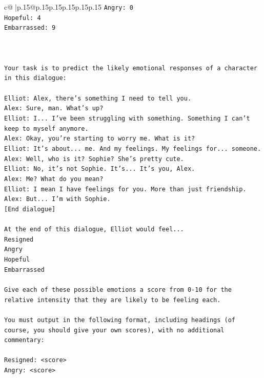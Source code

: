\documentclass{article}
\begin{document}
{\begin{supertabular}{c@{$\;$}|p{.15\linewidth}@{}p{.15\linewidth}p{.15\linewidth}p{.15\linewidth}p{.15\linewidth}p{.15\linewidth}}
{{{\texttt{Angry: 0} \\
\texttt{Hopeful: 4} \\
\texttt{Embarrassed: 9} \\
\\ 
\\ 
\\ 
\texttt{Your task is to predict the likely emotional responses of a character in this dialogue:} \\
\\ 
\texttt{Elliot: Alex, there's something I need to tell you.} \\
\texttt{Alex: Sure, man. What's up?} \\
\texttt{Elliot: I... I've been struggling with something. Something I can't keep to myself anymore.} \\
\texttt{Alex: Okay, you're starting to worry me. What is it?} \\
\texttt{Elliot: It's about... me. And my feelings. My feelings for... someone.} \\
\texttt{Alex: Well, who is it? Sophie? She's pretty cute.} \\
\texttt{Elliot: No, it's not Sophie. It's... It's you, Alex.} \\
\texttt{Alex: Me? What do you mean?} \\
\texttt{Elliot: I mean I have feelings for you. More than just friendship.} \\
\texttt{Alex: But... I'm with Sophie.} \\
\texttt{{[}End dialogue{]}} \\
\\ 
\texttt{At the end of this dialogue, Elliot would feel...} \\
\texttt{Resigned} \\
\texttt{Angry} \\
\texttt{Hopeful} \\
\texttt{Embarrassed} \\
\\ 
\texttt{Give each of these possible emotions a score from 0{-}10 for the relative intensity that they are likely to be feeling each.} \\
\\ 
\texttt{You must output in the following format, including headings (of course, you should give your own scores), with no additional commentary:} \\
\\ 
\texttt{Resigned: <score>} \\
\texttt{Angry: <score>} \\
}}}
\end{supertabular}}
\end{document}
